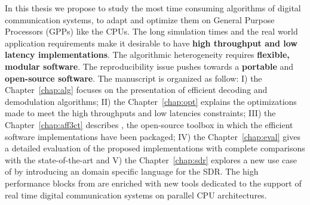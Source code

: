 In this thesis we propose to study the most time consuming algorithms of digital
communication systems, to adapt and optimize them on General Purpose Processors
(GPPs) like the CPUs. The long simulation times and the real world application
requirements make it desirable to have \textbf{high throughput and low latency
implementations}. The algorithmic heterogeneity requires \textbf{flexible,
modular software}. The reproducibility issue pushes towards a \textbf{portable}
and \textbf{open-source software}. The manuscript is organized as follow: I) the
Chapter~\ref{chap:alg} focuses on the presentation of efficient decoding and
demodulation algorithms; II) the Chapter~\ref{chap:opt} explains the
optimizations made to meet the high throughputs and low latencies constraints;
III) the Chapter~\ref{chap:aff3ct} describes \AFFECT, the open-source toolbox in
which the efficient software implementations have been packaged; IV) the
Chapter~\ref{chap:eval} gives a detailed evaluation of the proposed
implementations with complete comparisons with the state-of-the-art and V) the
Chapter~\ref{chap:sdr} explores a new use case of \AFFECT by introducing an
domain specific language for the SDR. The high performance blocks from \AFFECT
are enriched with new tools dedicated to the support of real time digital
communication systems on parallel CPU architectures.
